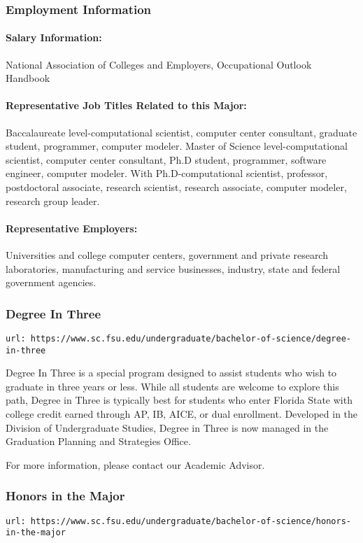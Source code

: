 \documentclass[12pt,a4paper]{article}
\begin{document}
\subsubsection*{Employment Information}
\paragraph{Salary Information:} National Association of Colleges and Employers, Occupational Outlook Handbook
\paragraph{Representative Job Titles Related to this Major:} Baccalaureate level-computational scientist, computer center consultant, graduate student, programmer, computer modeler. Master of Science level-computational scientist, computer center consultant, Ph.D student, programmer, software engineer, computer modeler. With Ph.D-computational scientist, professor, postdoctoral associate, research scientist, research associate, computer modeler, research group leader.
\paragraph{Representative Employers:} Universities and college computer centers, government and private research laboratories, manufacturing and service businesses, industry, state and federal government agencies.

\subsubsection{Degree In Three}
\texttt{url: https://www.sc.fsu.edu/undergraduate/bachelor-of-science/degree-in-three}

Degree In Three is a special program designed to assist students who wish to graduate in three years or less. While all students are welcome to explore this path, Degree in Three is typically best for students who enter Florida State with college credit earned through AP, IB, AICE, or dual enrollment. Developed in the Division of Undergraduate Studies, Degree in Three is now managed in the Graduation Planning and Strategies Office.

For more information, please contact our Academic Advisor.

\subsubsection{Honors in the Major}
\texttt{url: https://www.sc.fsu.edu/undergraduate/bachelor-of-science/honors-in-the-major}
\end{document}
